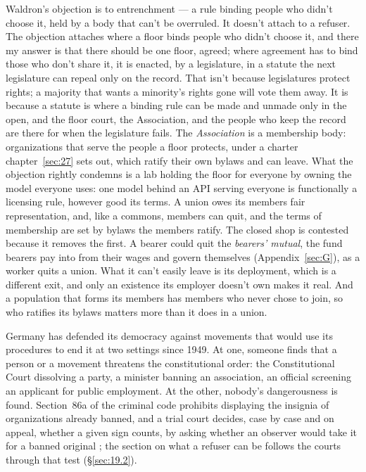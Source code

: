 Waldron's objection is to entrenchment — a rule binding people who didn't choose it, held by a body that can't be overruled. It doesn't attach to a refuser.
The objection attaches where a floor binds people who didn't choose it, and there my answer is that there should be one floor, agreed; where agreement has to bind those who don't share it, it is enacted, by a legislature, in a statute the next legislature can repeal only on the record. That isn't because legislatures protect rights; a majority that wants a minority's rights gone will vote them away. It is because a statute is where a binding rule can be made and unmade only in the open, and the floor court, the Association, and the people who keep the record are there for when the legislature fails. The \emph{Association} is a membership body: organizations that serve the people a floor protects, under a charter chapter~\ref{sec:27} sets out, which ratify their own bylaws and can leave. What the objection rightly condemns is a lab holding the floor for everyone by owning the model everyone uses: one model behind an API serving everyone is functionally a licensing rule, however good its terms. A union owes its members fair representation, and, like a commons, members can quit, and the terms of membership are set by bylaws the members ratify. The closed shop is contested because it removes the first. A bearer could quit the \emph{bearers' mutual}, the fund bearers pay into from their wages and govern themselves (Appendix~\ref{sec:G}), as a worker quits a union. What it can't easily leave is its deployment, which is a different exit, and only an existence its employer doesn't own makes it real. And a population that forms its members has members who never chose to join, so who ratifies its bylaws matters more than it does in a union.

Germany has defended its democracy against movements that would use its procedures to end it at two settings since 1949. At one, someone finds that a person or a movement threatens the constitutional order: the Constitutional Court dissolving a party, a minister banning an association, an official screening an applicant for public employment. At the other, nobody's dangerousness is found. Section~86a of the criminal code prohibits displaying the insignia of organizations already banned, and a trial court decides, case by case and on appeal, whether a given sign counts, by asking whether an observer would take it for a banned original \autocite{germany1998stgb}; the section on what a refuser can be follows the courts through that test (\S\ref{sec:19.2}).

